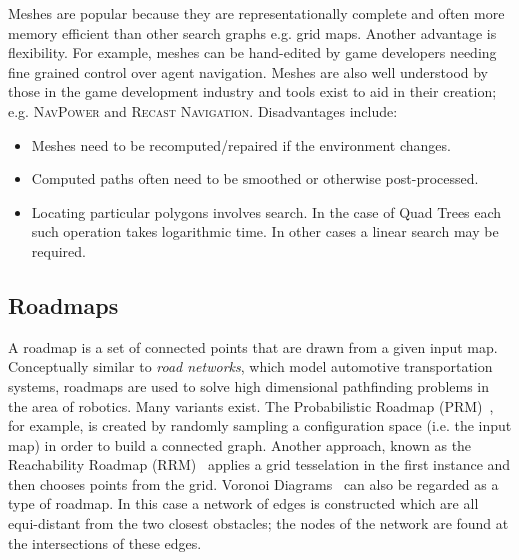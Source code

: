 Meshes are popular because they are representationally complete and often more
memory efficient than other search graphs e.g. grid maps. Another advantage is
flexibility. For example, meshes can be hand-edited by game developers needing
fine grained control over agent navigation. Meshes are also well understood by 
those in the game development industry and tools exist to aid in their creation; 
e.g. \textsc{NavPower} and \textsc{Recast Navigation}. Disadvantages include: 
\begin{itemize}
\item Meshes need to be recomputed/repaired if the environment changes.
\item Computed paths often need to be smoothed or otherwise post-processed.
\item Locating particular polygons involves search. In the case 
of Quad Trees each such operation takes logarithmic time. In other cases
a linear search may be required.
\end{itemize}


\subsection{Roadmaps}
\label{cha::lit::graphs::road}
A roadmap is a set of connected points that are drawn from a given input map.
Conceptually similar to \emph{road networks}, which model automotive
transportation systems, roadmaps are used to solve high dimensional pathfinding
problems in the area of robotics.  Many variants exist. The Probabilistic
Roadmap (PRM)~\citep{kavraki94}, for example,
 is created by randomly sampling a configuration space (i.e. the input map) in
order to build a connected graph. Another approach, known as the Reachability
Roadmap (RRM)~\citep{geraerts05} applies a grid tesselation in the first
instance and then chooses points from the grid.  Voronoi Diagrams~\citep{aurenhammer91}
can also be regarded as a type of roadmap. In this case a network of edges is constructed
which are all equi-distant from the two closest obstacles; the nodes of the network are 
found at the intersections of these edges.


